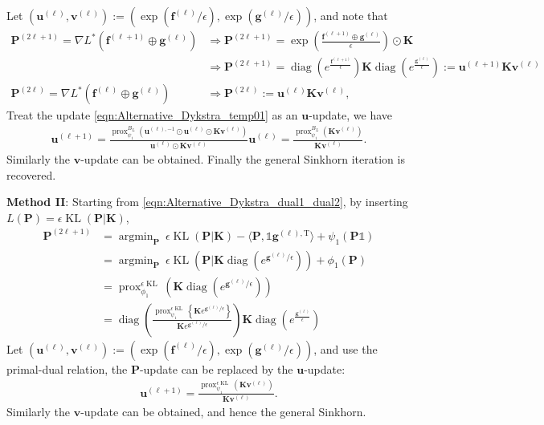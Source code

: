\documentclass[11pt]{book}
\newcommand{\prox}{\operatorname{prox}}
\newcommand{\diag}{\operatorname{diag}}
\newcommand{\KL}{\operatorname{KL}}
\newcommand{\argmin}{\operatorname{argmin}}
\begin{document}
Let $(\mathbf{u}^{(\ell)}, \mathbf{v}^{(\ell)}) := ( \exp(\mathbf{f}^{(\ell)}/\epsilon) , \exp(\mathbf{g}^{(\ell)}/\epsilon) )$, and note that 
\begin{align*}
    \mathbf{P}^{(2\ell+1)} = \nabla L^*(\mathbf{f}^{(\ell+1)}\oplus\mathbf{g}^{(\ell)})
    & \Longrightarrow 
    \mathbf{P}^{(2\ell+1)} = \exp \left( \frac{\mathbf{f}^{(\ell+1)}\oplus \mathbf{g}^{(\ell)}}{\epsilon} \right) \odot \mathbf{K} \\
    & \Longrightarrow
    \mathbf{P}^{(2\ell+1)} = \diag \left( e^{\frac{\mathbf{f}^{(\ell+1)}}{\epsilon}} \right) \mathbf{K}  \diag \left( e^{\frac{\mathbf{g}^{(\ell)}}{\epsilon}} \right)
    := \mathbf{u}^{(\ell+1)} \mathbf{K} \mathbf{v}^{(\ell)} \\
    \mathbf{P}^{(2\ell)} = \nabla L^*(\mathbf{f}^{(\ell)}\oplus\mathbf{g}^{(\ell)})
    & \Longrightarrow
    \mathbf{P}^{(2\ell)} 
    := \mathbf{u}^{(\ell)} \mathbf{K} \mathbf{v}^{(\ell)},
\end{align*}
Treat the update \eqref{eqn:Alternative_Dykstra_temp01} as an $\mathbf{u}$-update, we have
\begin{align*}
    \mathbf{u}^{(\ell+1)} = \frac { \prox_{\psi_1}^{B_L} \left( \mathbf{u}^{(\ell),-1} \odot \mathbf{u}^{(\ell)} \odot \mathbf{K}\mathbf{v}^{(\ell)}  \right) } {\mathbf{u}^{(\ell)} \odot \mathbf{K}\mathbf{v}^{(\ell)}} \mathbf{u}^{(\ell)} 
    = \frac{ \prox_{\psi_1}^{B_L}(\mathbf{K}\mathbf{v}^{(\ell)}) }{\mathbf{K}\mathbf{v}^{(\ell)}}.
\end{align*}
Similarly the $\mathbf{v}$-update can be obtained. Finally the general Sinkhorn iteration is recovered.

{\bf Method II}: Starting from \eqref{eqn:Alternative_Dykstra_dual1_dual2}, by inserting $L(\mathbf{P}) = \epsilon \KL(\mathbf{P}|\mathbf{K})$,
\begin{align*}
    \mathbf{P}^{(2\ell+1)} &= \argmin_{\mathbf{P}} \ \epsilon \KL(\mathbf{P}|\mathbf{K}) - \langle \mathbf{P}, \mathbb{1}\mathbf{g}^{(\ell),\mathrm{T}} \rangle + \psi_1(\mathbf{P}\mathbb{1}) \\
    & = \argmin_{\mathbf{P}} \ \epsilon \KL \left(\mathbf{P}\Big|\mathbf{K}\diag(e^{\mathbf{g}^{(\ell)}/\epsilon}) \right) + \phi_1(\mathbf{P}) \\
    & = \prox_{\phi_1}^{\epsilon\KL} \left( \mathbf{K}\diag(e^{\mathbf{g}^{(\ell)}/\epsilon}) \right) \\
    & = \diag 
    \left(  
        \frac{ \prox_{\psi_1}^{\epsilon\KL} \left\{ \mathbf{K}e^{\mathbf{g}^{(\ell)}/\epsilon} \right\}  }{ \mathbf{K}e^{\mathbf{g}^{(\ell)}/\epsilon} } 
    \right) 
    \mathbf{K}
    \diag \left( e^{\frac{\mathbf{g}^{(\ell)}}{\epsilon}} \right) 
\end{align*}
Let $(\mathbf{u}^{(\ell)}, \mathbf{v}^{(\ell)}) := ( \exp(\mathbf{f}^{(\ell)}/\epsilon) , \exp(\mathbf{g}^{(\ell)}/\epsilon) )$, and use the primal-dual relation, the $\mathbf{P}$-update can be replaced by the $\mathbf{u}$-update:
\begin{align*}
    \mathbf{u}^{(\ell+1)} = \frac{ \prox_{\psi_1}^{\epsilon\KL}(\mathbf{K}\mathbf{v}^{(\ell)}) }{\mathbf{K}\mathbf{v}^{(\ell)}}.
\end{align*}
Similarly the $\mathbf{v}$-update can be obtained, and hence the general Sinkhorn.
\end{document}
